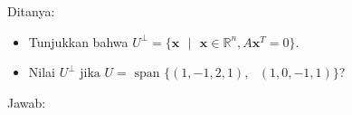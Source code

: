 \documentclass[12pt, a4paper]{scrartcl}
\begin{document}
\begin{enumerate}
\begin{enumerate}
                Ditanya:
                \begin{itemize}
                    \item Tunjukkan bahwa  $U^\perp = \{\textbf{x} \mbox{ }|\mbox{ } \textbf{x} \in \mathbb{R}^n, A\textbf{x}^T=0\}$.
                    \item Nilai $U^\perp \mbox{ jika }U = \mbox{ span } \{(1, -1, 2, 1), \mbox{ }(1, 0, -1, 1)\}$?
                \end{itemize}
            
                \pagebreak
            
                Jawab:
                
            \end{enumerate}
        \end{enumerate}
\end{document}
